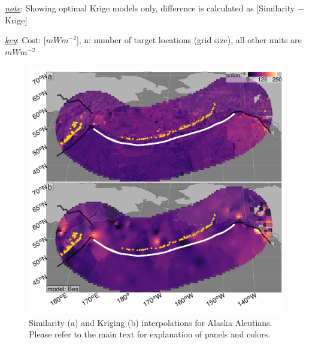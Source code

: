 \begin{table}
{\begin{threeparttable}
\begin{tabular}[t]{llrrrrrr}
\bottomrule
\end{tabular}
\begin{tablenotes}
\item \uline{\textit{note}}: Showing optimal Krige models only, difference is calculated as [Similarity $-$ Krige]
\item \uline{\textit{key}}: Cost: [$mWm^{-2}$], n: number of target locations (grid size), all other units are $mWm^{-2}$
\end{tablenotes}
\end{threeparttable}}
\end{table}

\clearpage

\begin{figure}[htbp]

{\centering \includegraphics[width=1\linewidth,]{assets/figs/chpt3/AlaskaAleutiansDiffComp} 

}

\caption[Similarityand Kriging interpolations for Alaska Aleutians]{Similarity (a) and Kriging (b) interpolations for Alaska Aleutians. Please refer to the main text for explanation of panels and colors.}\label{fig:alaskaAleutiansDiff}
\end{figure}


